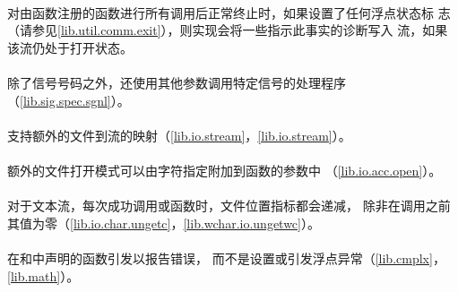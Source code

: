 \paragraph{}
对由函数注册的函数进行所有调用后正常终止时，如果设置了任何浮点状态标
志（请参见\ref{lib.util.comm.exit}），则实现会将一些指示此事实的诊断写入
流，如果该流仍处于打开状态。

\paragraph{}
除了信号号码之外，还使用其他参数调用特定信号的处理程序
（\ref{lib.sig.spec.sgnl}）。

\paragraph{}
支持额外的文件到流的映射（\ref{lib.io.stream}，\ref{lib.io.stream}）。

\paragraph{}
额外的文件打开模式可以由字符指定附加到函数的参数中
（\ref{lib.io.acc.open}）。

\paragraph{}
对于文本流，每次成功调用或函数时，文件位置指标都会递减，
除非在调用之前其值为零（\ref{lib.io.char.ungetc}，\ref{lib.wchar.io.ungetwc}）。

\paragraph{}
在和中声明的函数引发以报告错误，
而不是设置或引发浮点异常（\ref{lib.cmplx}，\ref{lib.math}）。
